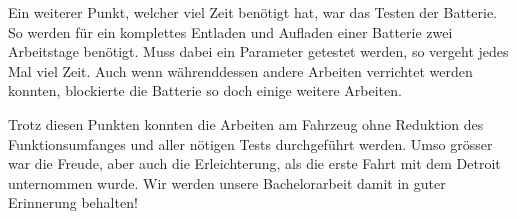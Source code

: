 Ein weiterer Punkt, welcher viel Zeit benötigt hat, war das Testen der Batterie. So werden für ein komplettes Entladen und Aufladen einer Batterie zwei Arbeitstage benötigt. Muss dabei ein Parameter getestet werden, so vergeht jedes Mal viel Zeit. Auch wenn währenddessen andere Arbeiten verrichtet werden konnten, blockierte die Batterie so doch einige weitere Arbeiten.

Trotz diesen Punkten konnten die Arbeiten am Fahrzeug ohne Reduktion des Funktionsumfanges und aller nötigen Tests durchgeführt werden. Umso grösser war die Freude, aber auch die Erleichterung, als die erste Fahrt mit dem Detroit unternommen wurde. Wir werden unsere Bachelorarbeit damit in guter Erinnerung behalten!